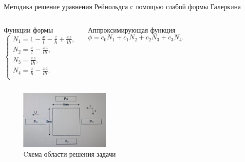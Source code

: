 \documentclass[ignoreonframetext,unicode]{beamer}
\begin{document}
\begin{frame}{Методика решение уравнения Рейнольдса с помощью слабой формы Галеркина}
	
\begin{columns}
		
	\begin{block}{Функции формы}
		\[
			\begin{cases}
				N_1 = 1 - \frac{x}{l} - \frac{z}{h} + \frac{x  z}{l  h}, \\
				N_2 = \frac{x}{l} - \frac{x  z}{l  h}, \\
				N_3 = \frac{x  z}{l h}, \\
				N_4 = \frac{z}{h} - \frac{x  z}{l  h}. \\
			\end{cases}
			\label{form-func}
		\]
		\end{block}
	
	\begin{block}{Аппроксимирующая функция}
		\[
			\phi = c_0 N_1 + c_1 N_2 + c_2 N_3 + c_3 N_4.
		\]
	\end{block}

\end{columns}

\begin{figure}[!htbp]
	\centering
	\includegraphics[width=0.4\textwidth]{taskGU}%
	\caption{Cхема области решения задачи}
	\vspace*{-2mm}
	\label{ser_graph}
\end{figure}
	
\end{frame}
\end{document}
